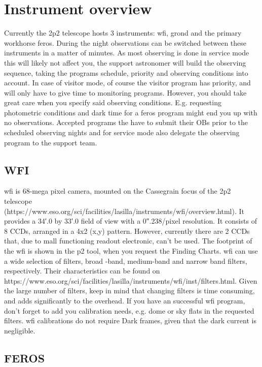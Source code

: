 \documentclass[11pt,fleqn,a4paper]{book}
\begin{document}
\section{Instrument overview}

Currently the 2p2 telescope hosts 3 instruments: \gls{wfi}, \gls{grond} and the primary workhorse \gls{feros}. During the night observations can be switched between these instruments in a matter of minutes. As most observing is done in service mode this will likely not affect you, the support astronomer will build the observing sequence, taking the programs schedule, priority and observing conditions into account. In case of visitor mode, of course the visitor program has priority, and will only  have to give time to monitoring programs. However, you should take great care when you specify said observing conditions. E.g. requesting photometric conditions and dark time for a \gls{feros} program might end you up with no observations.  Accepted programs the have to submit their OBs prior to the scheduled observing nights and for service mode also delegate the observing program to the support team. 

\subsection{WFI}

\gls{wfi} is 68-mega pixel camera, mounted on the Cassegrain focus of the 2p2 telescope (https://www.eso.org/sci/facilities/lasilla/instruments/wfi/overview.html). It provides a \ang{;34;}.0 by \ang{;33;}.0 field of view with a \ang{;;0}.238/pixel resolution. It consists of 8 CCDs, arranged in a 4x2 (x,y) pattern. However, currently there are 2 CCDs that, due to mall functioning readout electronic, can't be used.  The footprint of the \gls{wfi} is shown in the p2 tool, when you request the Finding Charts. \gls{wfi} can use a wide selection of filters, broad -band, medium-band and narrow band filters, respectively. Their characteristics can be found on  https://www.eso.org/sci/facilities/lasilla/instruments/wfi/inst/filters.html. Given the large number of filters, keep in mind that changing filters is time consuming, and adds significantly to the overhead. If you have an successful \gls{wfi} program, don't forget to add you calibration needs, e.g.  dome or sky flats in the requested filters. \gls{wfi}  calibrations do not require  Dark frames, given that the dark current is negligible.


\subsection{FEROS}
\end{document}
